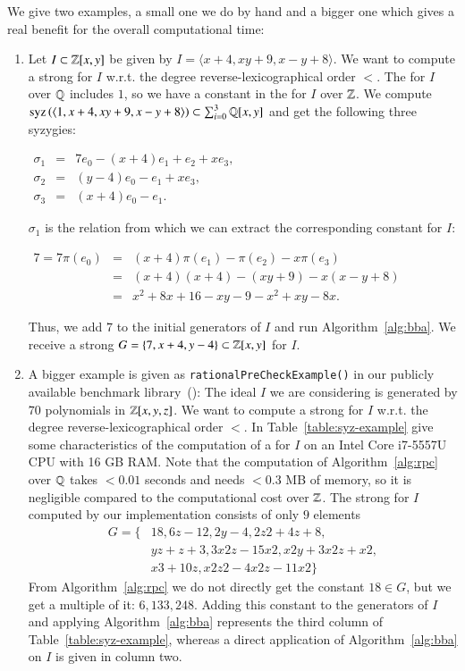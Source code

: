 \begin{example}
We give two examples, a small one we do by hand and a bigger one which gives a
real benefit for the overall computational time:
\begin{enumerate}
\item Let $I \subset \mathbb{Z}[x,y]$ be given by $I=\langle x+4, xy+9, x-y+8\rangle$.
We want to compute a strong \stb for $I$ w.r.t. the degree reverse-lexicographical
order $<$. The \stb for $I$ over $\mathbb{Q}$ includes $1$, so we have a constant in the
\stb for $I$ over $\mathbb{Z}$. We compute $\mathrm{syz}\left({\langle 1, x+4, xy+9, x-y+8\rangle}\right)
\subset \sum_{i=0}^3 \mathbb{Q}[x,y]$ and get the following three syzygies:
\begin{center}
$
\begin{array}{rcl}
\sigma_1 & = & 7 e_0 - (x+4) e_1 + e_2 + x e_3,\\
\sigma_2 & = & (y-4) e_0 - e_1 + x e_3,\\
\sigma_3 & = & (x+4) e_0 - e_1.
\end{array}
$
\end{center}
$\sigma_1$ is the relation from which we can extract the corresponding constant
for $I$:
\begin{center}
$
\begin{array}{rcl}
7 = 7 \pi(e_0) &=& (x+4) \pi(e_1) - \pi(e_2) - x \pi(e_3)\\
  &=& (x+4)(x+4) - (xy+9) - x(x-y+8)\\
  &=& x^2+8x+16 - xy -9 - x^2 + xy -8x.
\end{array}
$
\end{center}
Thus, we add $7$ to the initial generators of $I$ and run
Algorithm~\ref{alg:bba}. We receive a strong \stb $G = \{7, x+4, y-4\} \subset
\mathbb{Z}[x,y]$ for $I$.
\item A bigger example is given as \texttt{rationalPreCheckExample()} in our
publicly available benchmark library~(\cite{singular-benchmarks}): The ideal $I$
we are considering is generated by $70$ polynomials in $\mathbb{Z}[x,y,z]$. We want to
compute a strong \stb for $I$ w.r.t. the degree reverse-lexicographical order $<$.
In Table~\ref{table:syz-example} give some characteristics of the computation
of a \stb for $I$ on an Intel Core
i7-5557U CPU with 16 GB RAM. Note that the computation of
Algorithm~\ref{alg:rpc} over $\mathbb{Q}$ takes $<0.01$ seconds and needs $<0.3$ MB of
memory, so it is
negligible compared to the computational cost over $\mathbb{Z}$. The strong \stb for $I$ computed by
our implementation consists of only $9$ elements
\begin{align*}
G = \{&18, 6z-12, 2y-4, 2z2+4z+8,\\
     &yz+z+3, 3x2z-15x2, x2y+3x2z+x2,\\
     &x3+10z, x2z2-4x2z-11x2\}
\end{align*}
From Algorithm~\ref{alg:rpc} we do not directly get the constant $18 \in G$, but
we get a multiple of it: $6,133,248$. Adding this constant to the generators of
$I$ and applying Algorithm~\ref{alg:bba} represents the third column of
Table~\ref{table:syz-example}, whereas a direct application of
Algorithm~\ref{alg:bba} on $I$ is given in column two.
\end{enumerate}
\end{example}

